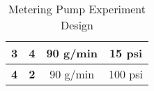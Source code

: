 \begin{table}[]
\begin{tabular}{rc|c|c|c|c|}
		\multicolumn{1}{|r|}{\textbf{3}}                                                & \textbf{4}                                                   & \multicolumn{2}{c|}{90 g/min}                                                                      & \multicolumn{2}{c|}{15 psi}                                                     \\ \hline
		\multicolumn{1}{|r|}{\textbf{4}}                                                & \textbf{2}                                                   & \multicolumn{2}{c|}{90 g/min}                                                                      & \multicolumn{2}{c|}{100 psi}                                                      \\ \hline
	\end{tabular}\caption{Metering Pump Experiment Design}\label{RoutDes}
\end{table}






